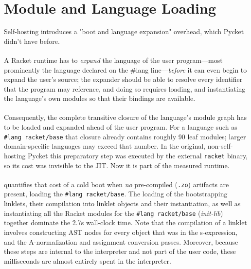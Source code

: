 	\section{Module and Language Loading}
	\label{section:module-and-language-loading}

		\begin{sectionpoint}
			Self-hosting introduces a "boot and language expansion" overhead, which Pycket didn't have before.
		\end{sectionpoint}

		\paragraph{}%
			A Racket runtime has to \emph{expand} the language of the user program—most prominently the language declared on the \#lang line—\emph{before} it can even begin to expand the user's source; the expander should be able to resolve every identifier that the program may reference, and doing so requires loading, and instantiating the language's own modules so that their bindings are available.


		\paragraph{}%
			Consequently, the complete transitive closure of the language's module graph has to be loaded and expanded ahead of the user program. For a language such as \texttt{\#lang racket/base} that closure already contains roughly 90 leaf modules; larger domain-specific languages may exceed that number. In the original, non-self-hosting Pycket this preparatory step was executed by the external \texttt{racket} binary, so its cost was invisible to the JIT. Now it is part of the measured runtime.

		\paragraph{}%
			 quantifies that cost of a cold boot when \emph{no} pre-compiled (\texttt{.zo}) artifacts are present, loading the \texttt{\#lang racket/base}. The loading of the bootstrapping linklets, their compilation into linklet objects and their instantiation, as well as instantiating all the Racket modules for the \texttt{\#lang racket/base} (\emph{init-lib}) together dominate the 2.7s wall-clock time. Note that the compilation of a linklet involves constructing AST nodes for every object that was in the s-expression, and the A-normalization and assignment conversion passes. Moreover, because these steps are internal to the interpreter and not part of the user code, these milliseconds are almost entirely spent in the interpreter.


